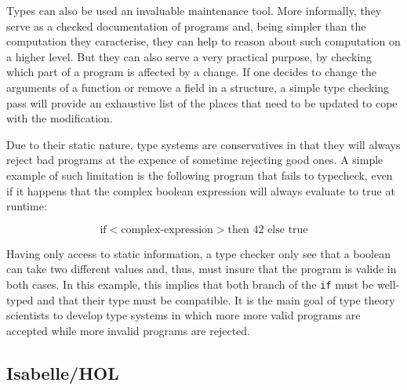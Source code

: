Types can also be used an invaluable maintenance tool. More informally, they serve as a checked
documentation of programs and, being simpler than the computation they caracterise, they can help
to reason about such computation on a higher level. But they can also serve a very practical
purpose, by checking which part of a program is affected by a change. If one decides to change the
arguments of a function or remove a field in a structure, a simple type checking pass will provide
an exhaustive list of the places that need to be updated to cope with the modification.


Due to their static nature, type systems are conservatives in that they will always reject bad
programs at the expence of sometime rejecting good ones. A simple example of such limitation is the
following program that fails to typecheck, even if it happens that the complex boolean expression
will always evaluate to true at runtime:

\begin{displaymath}
  \text{if} <\text{complex-expression}> \text{then } 42 \text{ else } \text{true}
\end{displaymath}

Having only access to static information, a type checker only see that a boolean can take two
different values and, thus, must insure that the program is valide in both cases. In this example,
this implies that both branch of the \texttt{if} must be well-typed and that their type must be
compatible. It is the main goal of type theory scientists to develop type systems in which more more
valid programs are accepted while more invalid programs are rejected.

\subsection{Isabelle/HOL}


